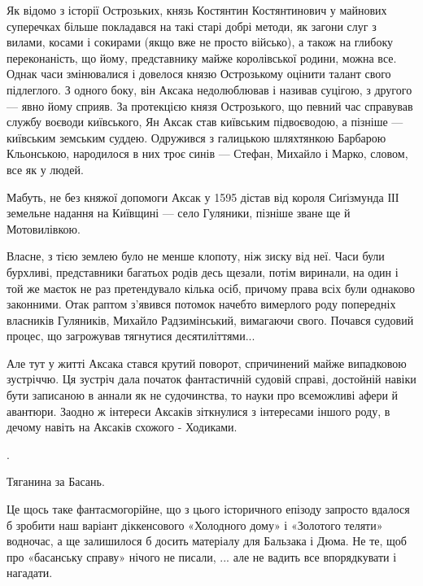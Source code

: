 
Як відомо з історії Острозьких, князь Костянтин Костянтинович у майнових
суперечках більше покладався на такі старі добрі методи, як загони слуг з
вилами, косами і сокирами (якщо вже не просто військо), а також на глибоку
переконаність, що йому, представнику майже королівської родини, можна все.
Однак часи змінювалися і довелося князю Острозькому оцінити талант свого
підлеглого. З одного боку, він Аксака недолюблював і називав суцігою, з другого
— явно йому сприяв. За протекцією князя Острозького, що певний час справував
службу воєводи київського, Ян Аксак став київським підвоєводою, а пізніше —
київським земським суддею. Одружився з галицькою шляхтянкою Барбарою
Кльонською, народилося в них троє синів — Стефан, Михайло і Марко, словом, все
як у людей.


Мабуть, не без княжої допомоги Аксак у 1595 дістав від короля Сиґізмунда ІІІ
земельне надання на Київщині — село Гуляники, пізніше зване ще й Мотовилівкою.

Власне, з тією землею було не менше клопоту, ніж зиску від неї. Часи були
бурхливі, представники багатьох родів десь щезали, потім виринали, на один і
той же маєток не раз претендувало кілька осіб, причому права всіх були однаково
законними. Отак раптом з’явився потомок начебто вимерлого роду попередніх
власників Гуляників, Михайло Радзимінський, вимагаючи свого. Почався судовий
процес, що загрожував тягнутися десятиліттями...


Але тут у житті Аксака стався крутий поворот, спричинений майже випадковою
зустріччю. Ця зустріч дала початок фантастичній судовій справі, достойній
навіки бути записаною в аннали як не судочинства, то науки про всеможливі афери
й авантюри. Заодно ж інтереси Аксаків зіткнулися з інтересами іншого роду, в
дечому навіть на Аксаків схожого - Ходиками.


.

Тяганина за Басань.

Це щось таке фантасмогорійне, що з цього історичного епізоду запросто вдалося б
зробити наш варіант діккенсового «Холодного дому» і «Золотого теляти» водночас,
а ще залишилося б досить матеріалу для Бальзака і Дюма. Не те, щоб про
«басанську справу» нічого не писали, ... але не вадить все впорядкувати і
нагадати. 

